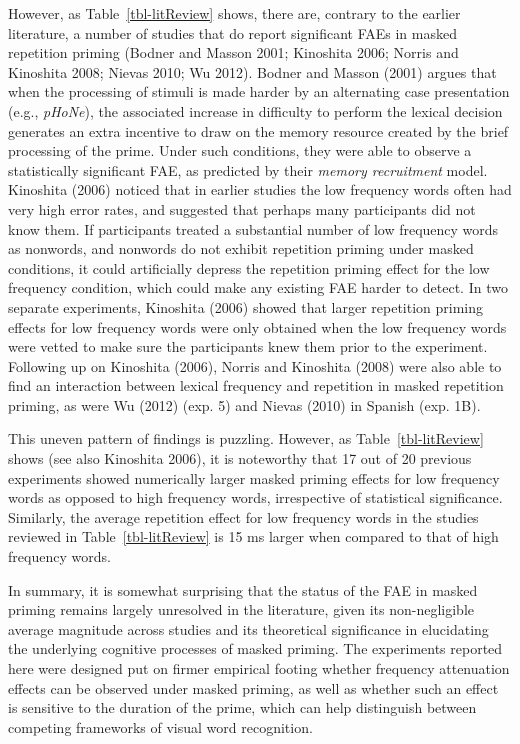 \documentclass[
]{interact}
\begin{document}
However, as Table~\ref{tbl-litReview} shows, there are, contrary to the
earlier literature, a number of studies that do report significant FAEs
in masked repetition priming (Bodner and Masson 2001; Kinoshita 2006;
Norris and Kinoshita 2008; Nievas 2010; Wu 2012). Bodner and Masson
(2001) argues that when the processing of stimuli is made harder by an
alternating case presentation (e.g., \emph{pHoNe}), the associated
increase in difficulty to perform the lexical decision generates an
extra incentive to draw on the memory resource created by the brief
processing of the prime. Under such conditions, they were able to
observe a statistically significant FAE, as predicted by their
\emph{memory recruitment} model. Kinoshita (2006) noticed that in
earlier studies the low frequency words often had very high error rates,
and suggested that perhaps many participants did not know them. If
participants treated a substantial number of low frequency words as
nonwords, and nonwords do not exhibit repetition priming under masked
conditions, it could artificially depress the repetition priming effect
for the low frequency condition, which could make any existing FAE
harder to detect. In two separate experiments, Kinoshita (2006) showed
that larger repetition priming effects for low frequency words were only
obtained when the low frequency words were vetted to make sure the
participants knew them prior to the experiment. Following up on
Kinoshita (2006), Norris and Kinoshita (2008) were also able to find an
interaction between lexical frequency and repetition in masked
repetition priming, as were Wu (2012) (exp. 5) and Nievas (2010) in
Spanish (exp. 1B).

This uneven pattern of findings is puzzling. However, as
Table~\ref{tbl-litReview} shows (see also Kinoshita 2006), it is
noteworthy that 17 out of 20 previous experiments showed numerically
larger masked priming effects for low frequency words as opposed to high
frequency words, irrespective of statistical significance. Similarly,
the average repetition effect for low frequency words in the studies
reviewed in Table~\ref{tbl-litReview} is 15 ms larger when compared to
that of high frequency words.

In summary, it is somewhat surprising that the status of the FAE in
masked priming remains largely unresolved in the literature, given its
non-negligible average magnitude across studies and its theoretical
significance in elucidating the underlying cognitive processes of masked
priming. The experiments reported here were designed put on firmer
empirical footing whether frequency attenuation effects can be observed
under masked priming, as well as whether such an effect is sensitive to
the duration of the prime, which can help distinguish between competing
frameworks of visual word recognition.
\end{document}
